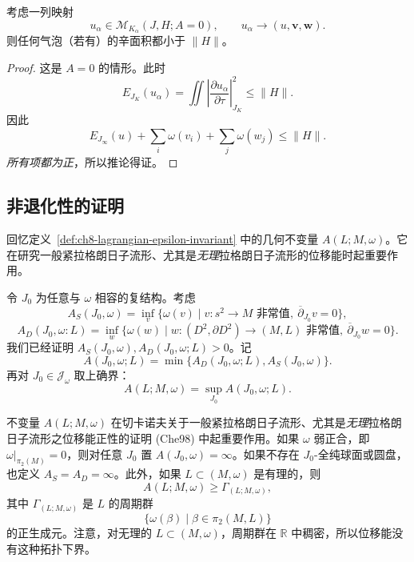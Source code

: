 \begin{corollary}\label{cor:ch11-bubble-energy-below-hofer}
考虑一列映射
\[
 u_\alpha\in\mathcal M_{K_\alpha}(J,H;A=0),
 \qquad u_\alpha\longrightarrow(u,\mathbf v,\mathbf w).
\]
则任何气泡（若有）的辛面积都小于 $\lVert H\rVert$。
\end{corollary}

\begin{proof}
这是 $A=0$ 的情形。此时
\[
 E_{J_K}(u_\alpha)
 =\iint\left|\frac{\partial u_\alpha}{\partial\tau}\right|_{J_K}^2
 \leq\lVert H\rVert.
\]
因此
\[
 E_{J_\infty}(u)+\sum_i\omega(v_i)+\sum_j\omega(w_j)
 \leq\lVert H\rVert.
\]
\emph{所有项都为正}，所以推论得证。
\end{proof}

\subsection{非退化性的证明}
\label{subsec:proof-hofer-nondegeneracy}

回忆定义~\ref{def:ch8-lagrangian-epsilon-invariant} 中的几何不变量
$A(L;M,\omega)$。它在研究一般紧拉格朗日子流形、尤其是\emph{无理}拉格朗日子流形的位移能时起重要作用。

令 $J_0$ 为任意与 $\omega$ 相容的复结构。考虑
\[
 A_S(J_0,\omega)
 =\inf_v\{\omega(v)\mid v:s^2\to M\text{ 非常值},\
 \overline\partial_{J_0}v=0\},
\]
\[
 A_D(J_0,\omega:L)
 =\inf_w\{\omega(w)\mid
 w:(D^2,\partial D^2)\to(M,L)\text{ 非常值},\
 \overline\partial_{J_0}w=0\}.
\]
我们已经证明 $A_S(J_0,\omega),A_D(J_0,\omega;L)>0$。记
\[
 A(J_0,\omega;L)
 =\min\{A_D(J_0,\omega;L),A_S(J_0,\omega)\}.
\]
再对 $J_0\in\mathcal J_\omega$ 取上确界：
\[
 A(L;M,\omega)=\sup_{J_0}A(J_0,\omega;L).
\]

\begin{remark}\label{rem:ch11-lagrangian-area-invariant}
不变量 $A(L;M,\omega)$ 在切卡诺夫关于一般紧拉格朗日子流形、尤其是\emph{无理}拉格朗日子流形之位移能正性的证明 (Che98) 中起重要作用。如果 $\omega$ 弱正合，即
$\omega|_{\pi_2(M)}=0$，则对任意 $J_0$ 置
$A(J_0,\omega)=\infty$。如果不存在 $J_0$-全纯球面或圆盘，也定义
$A_S=A_D=\infty$。此外，如果 $L\subset(M,\omega)$ 是有理的，则
\[
 A(L;M,\omega)\geq\Gamma_{(L;M,\omega)},
\]
其中 $\Gamma_{(L;M,\omega)}$ 是 $L$ 的周期群
\[
 \{\omega(\beta)\mid\beta\in\pi_2(M,L)\}
\]
的正生成元。注意，对无理的 $L\subset(M,\omega)$，周期群在 $\mathbb R$ 中稠密，所以位移能没有这种拓扑下界。
\end{remark}

